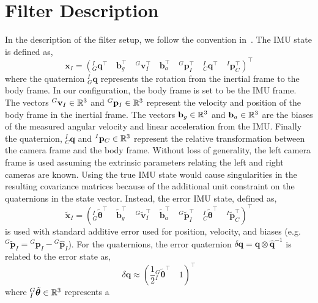 \section{Filter Description}
\label{sec: filter description}
In the description of the filter setup, we follow the convention in~\cite{mourikis2007multi}. The IMU state is defined as,
\begin{equation*}
\mathbf{x}_{I} = 
\left(
{}^I_G \mathbf{q}^\top \quad 
\mathbf{b}_g^\top \quad 
{}^G\mathbf{v}^\top_I \quad 
\mathbf{b}_a^\top \quad
{}^G\mathbf{p}^\top_I \quad
{}^I_C \mathbf{q}^\top \quad
{}^I\mathbf{p}^\top_C
\right)^\top
\end{equation*}
where the quaternion ${}^I_G \mathbf{q}$ represents the rotation from the inertial frame to the body frame. In our configuration, the body frame is set to be the IMU frame. The vectors ${}^G\mathbf{v}_I \in \mathbb{R}^3$ and ${}^G\mathbf{p}_I \in \mathbb{R}^3$ represent the velocity and position of the body frame in the inertial frame. The vectors $\mathbf{b}_g \in \mathbb{R}^3$ and $\mathbf{b}_a \in \mathbb{R}^3$ are the biases of the measured angular velocity and linear acceleration from the IMU. Finally the quaternion, ${}^I_C \mathbf{q}$ and ${}^I\mathbf{p}_C \in \mathbb{R}^3$ represent the relative transformation between the camera frame and the body frame. Without loss of generality, the left camera frame is used assuming the extrinsic parameters relating the left and right cameras are known. Using the true IMU state would cause singularities in the resulting covariance matrices because of the additional unit constraint on the quaternions in the state vector. Instead, the error IMU state, defined as,
\begin{equation*}
\tilde{\mathbf{x}}_{I} = 
\left(
{}^I_G \tilde{\bm{\theta}}^\top \quad 
\tilde{\mathbf{b}}_g^\top \quad 
{}^G\tilde{\mathbf{v}}^\top_I \quad 
\tilde{\mathbf{b}}_a^\top \quad
{}^G\tilde{\mathbf{p}}^\top_I \quad
{}^I_C \tilde{\bm{\theta}}^\top \quad
{}^I\tilde{\mathbf{p}}^\top_C
\right)^\top
\end{equation*}
is used with standard additive error used for position, velocity, and biases (e.g. ${}^G\tilde{\mathbf{p}}_I = {}^G\mathbf{p}_I-{}^G\hat{\mathbf{p}}_I$). For the quaternions, the error quaternion $\delta\mathbf{q} = \mathbf{q}\otimes\hat{\mathbf{q}}^{-1}$ is related to the error state as,
\begin{equation*}
\delta\mathbf{q} \approx
\left(
\frac{1}{2} {}^G_I\tilde{\bm{\theta}}^\top \quad 1
\right)^\top
\end{equation*}
where ${}^G_I\tilde{\bm{\theta}} \in \mathbb{R}^3$ represents a
